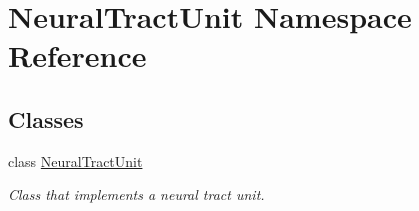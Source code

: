 \hypertarget{namespace_neural_tract_unit}{}\section{Neural\+Tract\+Unit Namespace Reference}
\label{namespace_neural_tract_unit}
\subsection*{Classes}
\begin{DoxyCompactItemize}
\item 
class \hyperlink{class_neural_tract_unit_1_1_neural_tract_unit}{Neural\+Tract\+Unit}
\begin{DoxyCompactList}\small\item\em Class that implements a neural tract unit. \end{DoxyCompactList}\end{DoxyCompactItemize}
